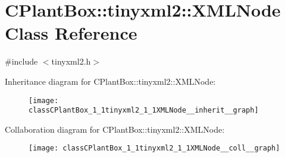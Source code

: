 \hypertarget{classCPlantBox_1_1tinyxml2_1_1XMLNode}{}\section{C\+Plant\+Box\+:\+:tinyxml2\+:\+:X\+M\+L\+Node Class Reference}
\label{classCPlantBox_1_1tinyxml2_1_1XMLNode}


{\ttfamily \#include $<$tinyxml2.\+h$>$}



Inheritance diagram for C\+Plant\+Box\+:\+:tinyxml2\+:\+:X\+M\+L\+Node\+:\nopagebreak
\begin{figure}[H]
\begin{center}
\leavevmode
\texttt{[image: classCPlantBox\_1\_1tinyxml2\_1\_1XMLNode\_\_inherit\_\_graph]}
\end{center}
\end{figure}


Collaboration diagram for C\+Plant\+Box\+:\+:tinyxml2\+:\+:X\+M\+L\+Node\+:\nopagebreak
\begin{figure}[H]
\begin{center}
\leavevmode
\texttt{[image: classCPlantBox\_1\_1tinyxml2\_1\_1XMLNode\_\_coll\_\_graph]}
\end{center}
\end{figure}
